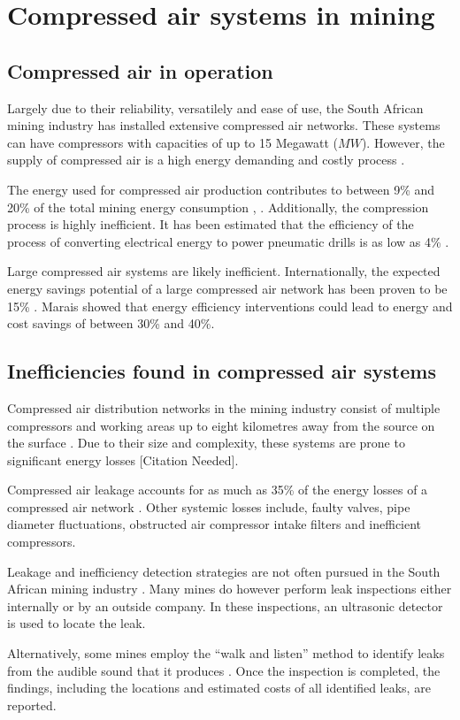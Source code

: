 \section{Compressed air systems in mining}
	\subsection{Compressed air in operation}\label{key}
		Largely due to their reliability, versatilely and ease of use, the South African mining industry has installed extensive compressed air networks. These systems can have compressors with capacities of up to 15 Megawatt ($MW$)\cite{Marais2012PhD}. However, the supply of compressed air is a high energy demanding and costly process \cite{padachi2009energy}.
		\par 
		The energy used for compressed air production contributes to between 9\% and 20\% of the total mining energy consumption	\cite{Eskom2010Energy}, \cite{du2011development}. Additionally, the compression process is highly inefficient. It has been estimated that the efficiency of the process of converting electrical energy to power pneumatic drills is as low as 4\% \cite{fraser2008saving}.
		\par
		Large compressed air systems are likely inefficient. Internationally, the expected energy savings potential of a large compressed air network has been proven to be 15\% \cite{neale2009compressed}. Marais \cite{marais2013simplification} showed that energy efficiency interventions could lead to energy and cost savings of between 30\% and 40\%. 
		
	\subsection{Inefficiencies found in compressed air systems}
		Compressed air distribution networks in the mining industry consist of multiple compressors and working areas up to eight kilometres away from the source on the surface \cite{Marais2012PhD}. Due to their size and complexity, these systems are prone to significant energy losses [Citation Needed].
		\par 
		Compressed air leakage accounts for as much as 35\% of the energy losses of a compressed air network \cite{Lawrence2004Improving}. Other systemic losses include, faulty valves, pipe diameter fluctuations, obstructed air compressor intake filters and inefficient compressors. 	
		\par
		Leakage and inefficiency detection strategies are not often pursued in the South African mining industry \cite{vanTonder2010Masters}. Many mines do however perform leak inspections either internally or by an outside company. In these inspections, an ultrasonic detector is used to locate the leak. 
		\par 
		Alternatively, some mines employ the \enquote{walk and listen} method to identify leaks from the audible sound that it produces \cite{vanTonder2010Masters}. Once the inspection is completed, the findings, including the locations and estimated costs of all identified leaks, are reported.
		
